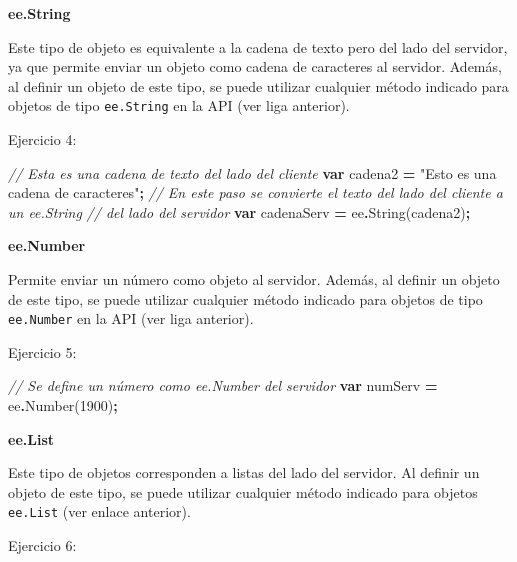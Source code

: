 \documentclass[
  12pt,
  letterpaper,
  twoside]{book}
\newenvironment{Shaded}{\begin{snugshade}}{\end{snugshade}}
\newcommand{\CommentTok}[1]{\textcolor[rgb]{0.56,0.35,0.01}{\textit{#1}}}
\newcommand{\DecValTok}[1]{\textcolor[rgb]{0.00,0.00,0.81}{#1}}
\newcommand{\FunctionTok}[1]{\textcolor[rgb]{0.00,0.00,0.00}{#1}}
\newcommand{\KeywordTok}[1]{\textcolor[rgb]{0.13,0.29,0.53}{\textbf{#1}}}
\newcommand{\NormalTok}[1]{#1}
\newcommand{\OperatorTok}[1]{\textcolor[rgb]{0.81,0.36,0.00}{\textbf{#1}}}
\newcommand{\StringTok}[1]{\textcolor[rgb]{0.31,0.60,0.02}{#1}}
\begin{document}
\textbf{ee.String}

Este tipo de objeto es equivalente a la cadena de texto pero del lado del servidor, ya que permite enviar un objeto como cadena de caracteres al servidor. Además, al definir un objeto de este tipo, se puede utilizar cualquier método indicado para objetos de tipo \texttt{ee.String} en la API (ver liga anterior).

Ejercicio 4:

\begin{Shaded}
\begin{Highlighting}[]
\CommentTok{// Esta es una cadena de texto del lado del cliente}
\KeywordTok{var}\NormalTok{ cadena2 }\OperatorTok{=} \StringTok{"Esto es una cadena de caracteres"}\OperatorTok{;}
\CommentTok{// En este paso se convierte el texto del lado del cliente a un ee.String}
\CommentTok{// del lado del servidor}
\KeywordTok{var}\NormalTok{ cadenaServ }\OperatorTok{=}\NormalTok{ ee}\OperatorTok{.}\FunctionTok{String}\NormalTok{(cadena2)}\OperatorTok{;}                         
\end{Highlighting}
\end{Shaded}

\textbf{ee.Number}

Permite enviar un número como objeto al servidor. Además, al definir un objeto de este tipo, se puede utilizar cualquier método indicado para objetos de tipo \texttt{ee.Number} en la API (ver liga anterior).

Ejercicio 5:

\begin{Shaded}
\begin{Highlighting}[]
\CommentTok{// Se define un número como \textasciigrave{}ee.Number\textasciigrave{} del servidor}
\KeywordTok{var}\NormalTok{ numServ }\OperatorTok{=}\NormalTok{ ee}\OperatorTok{.}\FunctionTok{Number}\NormalTok{(}\DecValTok{1900}\NormalTok{)}\OperatorTok{;}                              
\end{Highlighting}
\end{Shaded}

\textbf{ee.List}

Este tipo de objetos corresponden a listas del lado del servidor. Al definir un objeto de este tipo, se puede utilizar cualquier método indicado para objetos \texttt{ee.List} (ver enlace anterior).

Ejercicio 6:
\end{document}

